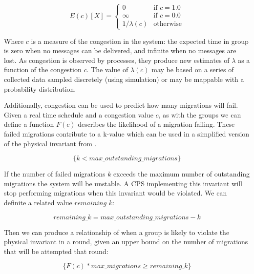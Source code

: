 \begin{equation}
E(c)[X] = \begin{cases}
0 & \text{if } c = 1.0 \\
\infty & \text{if } c = 0.0 \\
1 / \lambda(c) & \text{otherwise}
\end{cases}
\end{equation}

Where $c$ is a measure of the congestion in the system: the expected time in group is zero when no messages can be delivered, and infinite when no messages are lost.
As congestion is observed by processes, they produce new estimates of $\lambda$ as a function of the congestion $c$.
The value of $\lambda(c)$ may be based on a series of collected data sampled discretely (using simulation) or may be mappable with a probability distribution.

Additionally, congestion can be used to predict how many migrations will fail.
Given a real time schedule and a congestion value $c$, as with the groups we can define a function $F(c)$ describes the likelihood of a migration failing.
These failed migrations contribute to a k-value which can be used in a simplified version of the physical invariant from \cite{HARINI}\cite{CPS1}\cite{CPS2}.

\begin{equation}
\{ k < max\_outstanding\_migrations \}
\end{equation}

If the number of failed migrations $k$ exceeds the maximum number of outstanding migrations the system will be unstable.
A CPS implementing this invariant will stop performing migrations when this invariant would be violated.
We can definite a related value $remaining\_k$:

\begin{equation}
remaining\_k = max\_outstanding\_migrations - k
\end{equation}  

Then we can produce a relationship of when a group is likely to violate the physical invariant in a round, given an upper bound on the number of migrations that will be attempted that round:

\begin{equation}
\{ F(c) * max\_migrations \geq remaining\_k \}
\end{equation}

